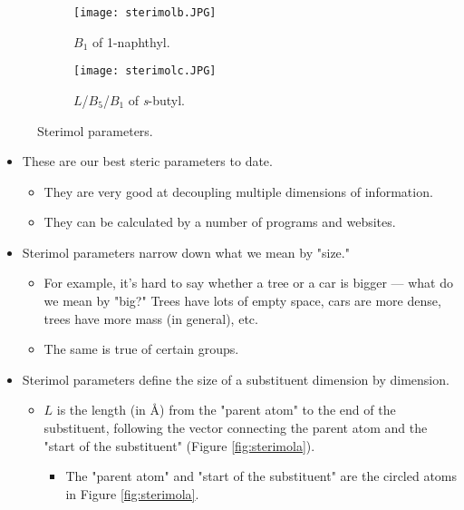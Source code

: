 \documentclass[../notes.tex]{subfiles}
\begin{document}
\begin{itemize}
\begin{figure}[H]
        \begin{subfigure}[b]{0.23\linewidth}
            \centering
            \texttt{[image: sterimolb.JPG]}
            \caption{$B_1$ of 1-naphthyl.}
            \label{fig:sterimolb}
        \end{subfigure}
        \begin{subfigure}[b]{0.23\linewidth}
            \centering
            \texttt{[image: sterimolc.JPG]}
            \caption{$L$/$B_5$/$B_1$ of \emph{s}-butyl.}
            \label{fig:sterimolc}
        \end{subfigure}
        \caption{Sterimol parameters.}
        \label{fig:sterimol}
    \end{figure}
    \begin{itemize}
        \item These are our best steric parameters to date.
        \begin{itemize}
            \item They are very good at decoupling multiple dimensions of information.
            \item They can be calculated by a number of programs and websites.
        \end{itemize}
        \item Sterimol parameters narrow down what we mean by "size."
        \begin{itemize}
            \item For example, it's hard to say whether a tree or a car is bigger --- what do we mean by "big?" Trees have lots of empty space, cars are more dense, trees have more mass (in general), etc.
            \item The same is true of certain  groups.
        \end{itemize}
        \item Sterimol parameters define the size of a substituent dimension by dimension.
        \begin{itemize}
            \item $L$ is the length (in \si{\angstrom}) from the "parent atom" to the end of the substituent, following the vector connecting the parent atom and the "start of the substituent" (Figure \ref{fig:sterimola}).
            \begin{itemize}
                \item The "parent atom" and "start of the substituent" are the circled atoms in Figure \ref{fig:sterimola}.
            \end{itemize}

\end{itemize}
\end{itemize}
\end{itemize}
\end{document}
